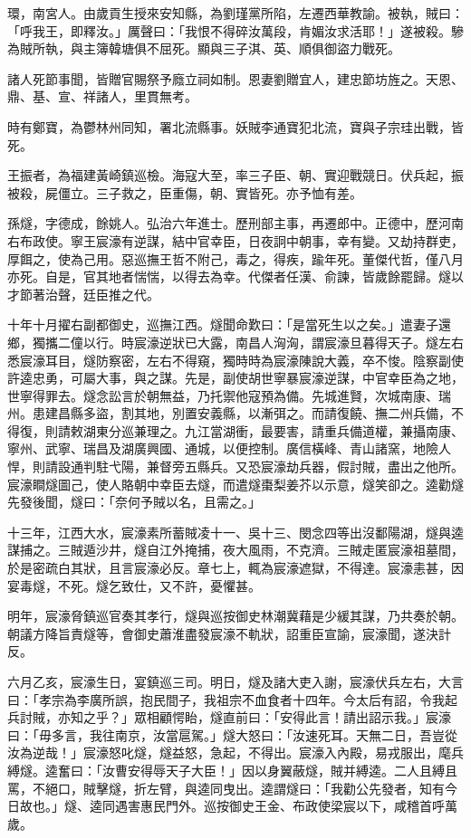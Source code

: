 \begin{pinyinscope}
環，南宮人。由歲貢生授來安知縣，為劉瑾黨所陷，左遷西華教諭。被執，賊曰：「呼我王，即釋汝。」厲聲曰：「我恨不得碎汝萬段，肯媚汝求活耶！」遂被殺。驂為賊所執，與主簿韓塘俱不屈死。顯與三子淇、英、順俱御盜力戰死。

諸人死節事聞，皆贈官賜祭予廕立祠如制。恩妻劉贈宜人，建忠節坊旌之。天恩、鼎、基、宣、祥諸人，里貫無考。

時有鄭寶，為鬱林州同知，署北流縣事。妖賊李通寶犯北流，寶與子宗珪出戰，皆死。

王振者，為福建黃崎鎮巡檢。海寇大至，率三子臣、朝、實迎戰競日。伏兵起，振被殺，屍僵立。三子救之，臣重傷，朝、實皆死。亦予恤有差。

孫燧，字德成，餘姚人。弘治六年進士。歷刑部主事，再遷郎中。正德中，歷河南右布政使。寧王宸濠有逆謀，結中官幸臣，日夜詗中朝事，幸有變。又劫持群吏，厚餌之，使為己用。惡巡撫王哲不附己，毒之，得疾，踰年死。董傑代哲，僅八月亦死。自是，官其地者惴惴，以得去為幸。代傑者任漢、俞諫，皆歲餘罷歸。燧以才節著治聲，廷臣推之代。

十年十月擢右副都御史，巡撫江西。燧聞命歎曰：「是當死生以之矣。」遣妻子還鄉，獨攜二僮以行。時宸濠逆狀已大露，南昌人洶洶，謂宸濠旦暮得天子。燧左右悉宸濠耳目，燧防察密，左右不得窺，獨時時為宸濠陳說大義，卒不悛。陰察副使許逵忠勇，可屬大事，與之謀。先是，副使胡世寧暴宸濠逆謀，中官幸臣為之地，世寧得罪去。燧念訟言於朝無益，乃托禦他寇預為備。先城進賢，次城南康、瑞州。患建昌縣多盜，割其地，別置安義縣，以漸弭之。而請復饒、撫二州兵備，不得復，則請敕湖東分巡兼理之。九江當湖衝，最要害，請重兵備道權，兼攝南康、寧州、武寧、瑞昌及湖廣興國、通城，以便控制。廣信橫峰、青山諸窯，地險人悍，則請設通判駐弋陽，兼督旁五縣兵。又恐宸濠劫兵器，假討賊，盡出之他所。宸濠瞷燧圖己，使人賂朝中幸臣去燧，而遣燧棗梨姜芥以示意，燧笑卻之。逵勸燧先發後聞，燧曰：「奈何予賊以名，且需之。」

十三年，江西大水，宸濠素所蓄賊凌十一、吳十三、閔念四等出沒鄱陽湖，燧與逵謀捕之。三賊遁沙井，燧自江外掩捕，夜大風雨，不克濟。三賊走匿宸濠祖墓間，於是密疏白其狀，且言宸濠必反。章七上，輒為宸濠遮獄，不得達。宸濠恚甚，因宴毒燧，不死。燧乞致仕，又不許，憂懼甚。

明年，宸濠脅鎮巡官奏其孝行，燧與巡按御史林潮冀藉是少緩其謀，乃共奏於朝。朝議方降旨責燧等，會御史蕭淮盡發宸濠不軌狀，詔重臣宣諭，宸濠聞，遂決計反。

六月乙亥，宸濠生日，宴鎮巡三司。明日，燧及諸大吏入謝，宸濠伏兵左右，大言曰：「孝宗為李廣所誤，抱民間子，我祖宗不血食者十四年。今太后有詔，令我起兵討賊，亦知之乎？」眾相顧愕眙，燧直前曰：「安得此言！請出詔示我。」宸濠曰：「毋多言，我往南京，汝當扈駕。」燧大怒曰：「汝速死耳。天無二日，吾豈從汝為逆哉！」宸濠怒叱燧，燧益怒，急起，不得出。宸濠入內殿，易戎服出，麾兵縛燧。逵奮曰：「汝曹安得辱天子大臣！」因以身翼蔽燧，賊并縛逵。二人且縛且罵，不絕口，賊擊燧，折左臂，與逵同曳出。逵謂燧曰：「我勸公先發者，知有今日故也。」燧、逵同遇害惠民門外。巡按御史王金、布政使梁宸以下，咸稽首呼萬歲。


\end{pinyinscope}

